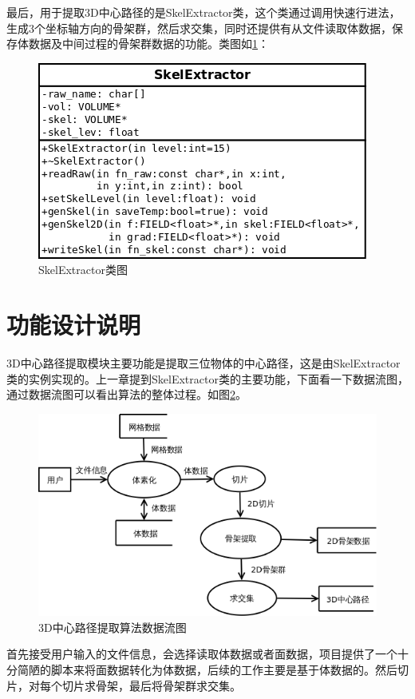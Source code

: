 最后，用于提取3D中心路径的是SkelExtractor类，这个类通过调用快速行进法，生成3个坐标轴方向的骨架群，然后求交集，同时还提供有从文件读取体数据，保存体数据及中间过程的骨架群数据的功能。类图如\ref{skelextractor-class}：
\begin{figure}[h!]
    \centering
    \includegraphics[width=300bp]{figure/skelextractor.png}
    \caption{SkelExtractor类图}
    \label{skelextractor-class}
\end{figure}

\section{功能设计说明}
3D中心路径提取模块主要功能是提取三位物体的中心路径，这是由SkelExtractor类的实例实现的。上一章提到SkelExtractor类的主要功能，下面看一下数据流图，通过数据流图可以看出算法的整体过程。如图\ref{dataflow}。
\begin{figure}[h!]
    \centering
    \includegraphics[width=400bp]{figure/dataflow.png}
    \caption{3D中心路径提取算法数据流图}
    \label{dataflow}
\end{figure}
首先接受用户输入的文件信息，会选择读取体数据或者面数据，项目提供了一个十分简陋的脚本来将面数据转化为体数据，后续的工作主要是基于体数据的。然后切片，对每个切片求骨架，最后将骨架群求交集。

